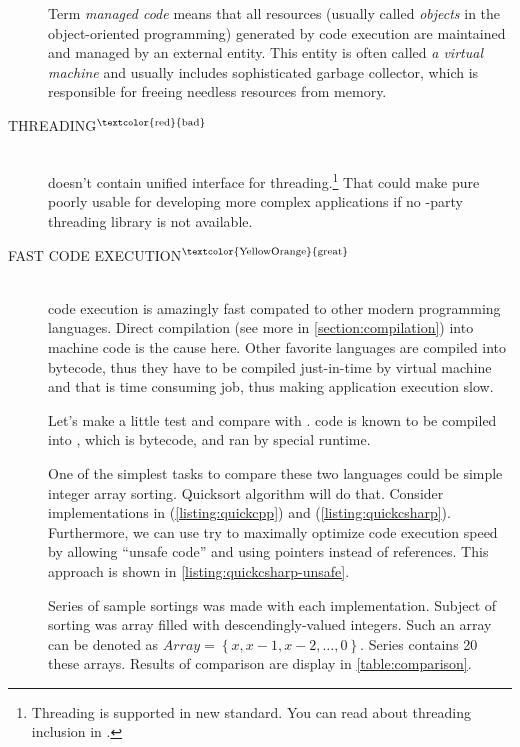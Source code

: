 \begin{description}
\begin{fdocextra}
Term \textit{managed code} means that all resources (usually called \emph{objects} in the object-oriented programming) generated by code execution are maintained and managed by an external entity. This entity is often called \emph{a virtual machine} and usually includes sophisticated garbage collector, which is responsible for freeing needless resources from memory.
\end{fdocextra}

\item[THREADING$^{\text{\textcolor{red}{bad}}}$]\hfill \\
\cpp doesn't contain unified interface for threading.\footnote{Threading is supported in new  standard. You can read about threading inclusion in \citep[p.~1114-1160]{various:cppstandard}.} That could make pure \cpp poorly usable for developing more complex applications if no -party threading library is not available.

\item[FAST CODE EXECUTION$^{\text{\textcolor{YellowOrange}{great}}}$]\hfill \\
\cpp code execution is amazingly fast compated to other modern programming languages. Direct compilation (see more in \autoref{section:compilation})  into machine code is the cause here. Other favorite languages are compiled into bytecode, thus they have to be compiled just-in-time by virtual machine and that is time consuming job, thus making application execution slow.

Let's make a little test and compare \cpp with \csharp. \csharp code is known to be compiled into , which is bytecode, and ran by special runtime.

One of the simplest tasks to compare these two languages could be simple integer array sorting. Quicksort algorithm will do that. Consider implementations in \cpp (\autoref{listing:quickcpp}) and \csharp(\autoref{listing:quickcsharp}). Furthermore, we can use try to maximally optimize \csharp code execution speed by  allowing \enquote{unsafe code} and using pointers instead of references. This approach is shown in \autoref{listing:quickcsharp-unsafe}.

Series of sample sortings was made with each implementation. Subject of sorting was array filled with descendingly-valued integers. Such an array can be denoted as $Array = \left\{ x, x-1, x-2, \ldots, 0 \right\}$. Series contains 20 these arrays. Results of comparison are display in \autoref{table:comparison}.


\end{description}
